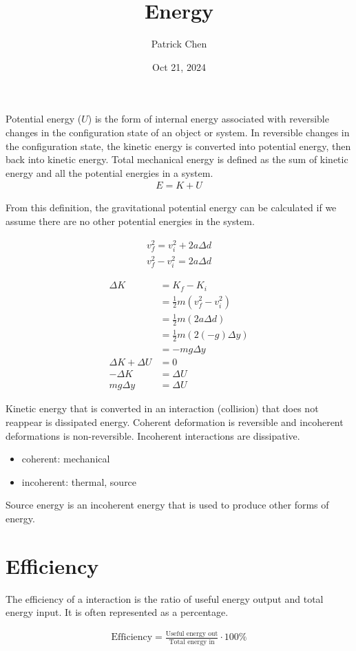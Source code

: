 \documentclass{article}
\title{Energy}
\author{Patrick Chen}
\date{Oct 21, 2024}
\theoremstyle{mytheoremstyle}
\theoremstyle{mytheoremstyle}
\theoremstyle{myproblemstyle}
\begin{document}
    \maketitle
    Potential energy ($U$) is the form of internal energy associated with reversible
    changes in the configuration state of an object or system. In reversible
    changes in the configuration state, the kinetic energy is converted into
    potential energy, then back into kinetic energy. Total mechanical energy is
    defined as the sum of kinetic energy and all the potential energies in a
    system.
    \begin{align*}
        E = K+U
    \end{align*}

    From this definition, the gravitational potential energy can be calculated
    if we assume there are no other potential energies in the system.

    \begin{align*}
        v_f^2=v_i^2+2a\Delta d \\
        v_f^2-v_i^2 = 2a\Delta d
    \end{align*}

    \begin{align*}
        \Delta K &= K_f - K_i \\
        &= \frac{1}{2} m(v_f^2 - v_i^2) \\
        &= \frac{1}{2} m(2a\Delta d) \\
        &= \frac{1}{2} m(2(-g)\Delta y) \\
        &= -mg\Delta y \\
        \Delta K + \Delta U &= 0 \\
        - \Delta K &= \Delta U \\
        mg\Delta y &= \Delta U
    \end{align*}


    Kinetic energy that is converted in an interaction (collision) that does not
    reappear is dissipated energy. Coherent deformation is reversible and
    incoherent deformations is non-reversible. Incoherent interactions are
    dissipative.

    \begin{itemize}
        \item coherent: mechanical
        \item incoherent: thermal, source
    \end{itemize}

    Source energy is an incoherent energy that is used to produce other forms of
    energy.

    \section*{Efficiency}
    The efficiency of a interaction is the ratio of useful energy output and
    total energy input. It is often represented as a percentage.

    \begin{align*}
        \text{Efficiency} = \frac{\text{Useful energy out}}{\text{Total energy
        in}} \cdot 100\%
    \end{align*}
\end{document}
